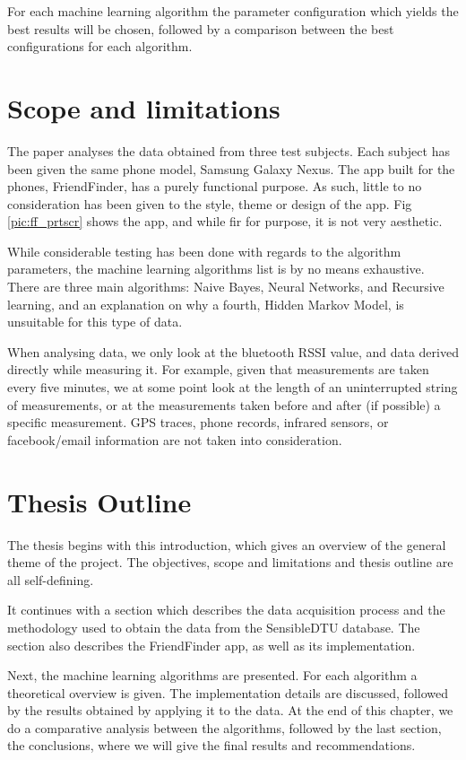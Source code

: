 For each machine learning algorithm the parameter configuration which yields the best results will be chosen, followed by a comparison between the best configurations for each algorithm.      

\section{Scope and limitations}

The paper analyses the data obtained from three test subjects. Each subject has been given the same phone model, Samsung Galaxy Nexus. The app built for the phones, FriendFinder, has a purely functional purpose. As such, little to no consideration has been given to the style, theme or design of the app. Fig \ref{pic:ff_prtscr} shows the app, and while fir for purpose, it is not very aesthetic.

While considerable testing has been done with regards to the algorithm parameters, the machine learning algorithms list is by no means exhaustive. There are three main algorithms: Naive Bayes, Neural Networks, and Recursive learning, and an explanation on why a fourth, Hidden Markov Model, is unsuitable for this type of data. 

When analysing data, we only look at the bluetooth RSSI value, and data derived directly while measuring it. For example, given that measurements are taken every five minutes, we at some point look at the length of an uninterrupted string of measurements, or at the measurements taken before and after (if possible) a specific measurement. GPS traces, phone records, infrared sensors, or facebook/email information are not taken into consideration.

\section{Thesis Outline}

The thesis begins with this introduction, which gives an overview of the general theme of the project. The objectives, scope and limitations and thesis outline are all self-defining. 

It continues with a section which describes the data acquisition process and the methodology used to obtain the data from the SensibleDTU database. The section also describes the FriendFinder app, as well as its implementation.

Next, the machine learning algorithms are presented. For each algorithm a theoretical overview is given. The implementation details are discussed, followed by the results obtained by applying it to the data. At the end of this chapter, we do a comparative analysis between the algorithms, followed by the last section, the conclusions, where we will give the final results and recommendations.
